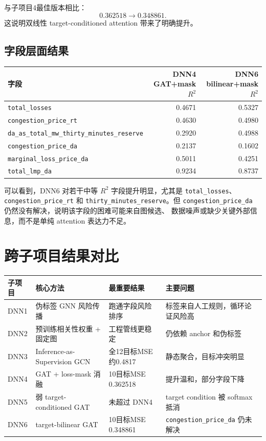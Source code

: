 \documentclass[UTF8]{ctexart}
\begin{document}
与子项目4最佳版本相比：
\[
0.362518
\rightarrow
0.348861.
\]
这说明双线性 target-conditioned attention 带来了明确提升。

\subsection{字段层面结果}

\begin{center}
\begin{tabular}{lrr}
\toprule
字段 & DNN4 GAT+mask \(R^2\) & DNN6 bilinear+mask \(R^2\) \\
\midrule
\texttt{total\_losses} & 0.4671 & 0.5327 \\
\texttt{congestion\_price\_rt} & 0.4630 & 0.4980 \\
\texttt{da\_as\_total\_mw\_thirty\_minutes\_reserve} & 0.2920 & 0.4988 \\
\texttt{congestion\_price\_da} & 0.2137 & 0.1602 \\
\texttt{marginal\_loss\_price\_da} & 0.5011 & 0.4251 \\
\texttt{total\_lmp\_da} & 0.9234 & 0.8737 \\
\bottomrule
\end{tabular}
\end{center}

可以看到，DNN6 对若干中等 \(R^2\) 字段提升明显，尤其是 \texttt{total\_losses}、
\texttt{congestion\_price\_rt} 和 \texttt{thirty\_minutes\_reserve}。但
\texttt{congestion\_price\_da} 仍然没有解决，说明该字段的困难可能来自图候选、
数据噪声或缺少关键外部信息，而不是单纯 attention 表达力不足。

\section{跨子项目结果对比}

\begin{center}
\begin{tabular}{llll}
\toprule
子项目 & 核心方法 & 最重要结果 & 主要问题 \\
\midrule
DNN1 & 伪标签 GNN 风险传播 & 跑通字段风险排序 & 标签来自人工规则，循环论证风险高 \\
DNN2 & 预训练相关性权重 + 固定图 & 工程管线更稳定 & 仍依赖 anchor 和伪标签 \\
DNN3 & Inference-as-Supervision GCN & 全12目标MSE约0.4817 & 静态聚合，目标冲突明显 \\
DNN4 & GAT + loss-mask 消融 & 10目标MSE 0.362518 & 提升温和，部分字段下降 \\
DNN5 & 弱 target-conditioned GAT & 未超过 DNN4 & target condition 被 softmax 抵消 \\
DNN6 & target-bilinear GAT & 10目标MSE 0.348861 & \texttt{congestion\_price\_da} 仍未解决 \\
\bottomrule
\end{tabular}
\end{center}
\end{document}

